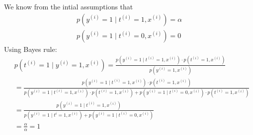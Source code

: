\begin{answer}
We know from the intial assumptions that
\begin{align*}
    p(y^{(i)}=1\mid t^{(i)} = 1, x^{(i)}) = \alpha \\
    p(y^{(i)}=1\mid t^{(i)} = 0, x^{(i)}) = 0
\end{align*}
Using Bayes rule:
\begin{align*}
    &p(t^{(i)}=1\mid y^{(i)} = 1, x^{(i)}) = \frac{p(y^{(i)}=1\mid t^{(i)} = 1, x^{(i)}) \cdot p(t^{(i)}=1, x^{(i)})}{p(y^{(i)}=1, x^{(i)})} \\
    &= \frac{p(y^{(i)}=1\mid t^{(i)} = 1, x^{(i)}) \cdot p(t^{(i)}=1, x^{(i)})}{p(y^{(i)}=1\mid t^{(i)}=1, x^{(i)}) \cdot p(t^{(i)}=1, x^{(i)}) + p(y^{(i)}=1\mid t^{(i)}=0, x^{(i)})\cdot p(t^{(i)}=1, x^{(i)})} \\
    &= \frac{p(y^{(i)}=1\mid t^{(i)} = 1, x^{(i)})}{p(y^{(i)}=1\mid t^{i}=1, x^{(i)}) + p(y^{(i)}=1\mid t^{(i)}=0, x^{(i)})}  \\
    &= \frac{\alpha}{\alpha} = 1 \\
\end{align*}
\end{answer}

